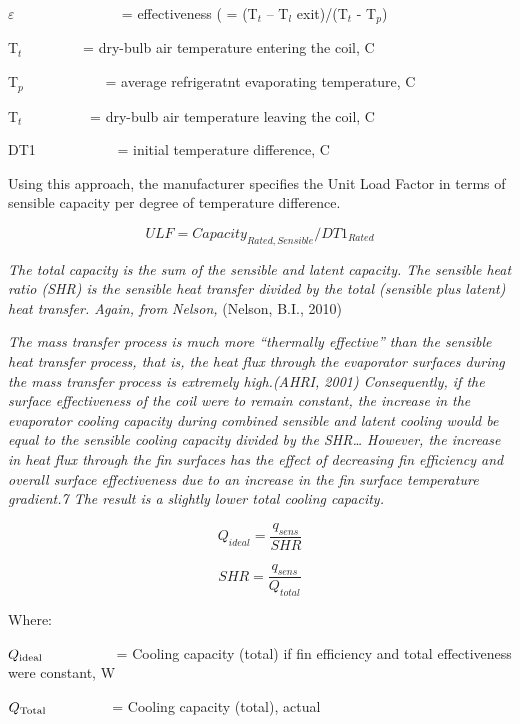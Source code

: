 \(\varepsilon\) ~~~~~~~~~~~~~~ = effectiveness ( = (T\(_{t}\) -- T\(_{l}\) exit)/(T\(_{t}\) - T\(_{p}\))

T\(_{t}\)~~~~~~~~ = dry-bulb air temperature entering the coil, C

T\(_{p}\)~~~~~~~~~~~ = average refrigeratnt evaporating temperature, C

T\(_{t}\)~~~~~~~~~ = dry-bulb air temperature leaving the coil, C

DT1~~~~~~~~~~~ = initial temperature difference, C

Using this approach, the manufacturer specifies the Unit Load Factor in terms of sensible capacity per degree of temperature difference.

\begin{equation}
ULF = Capacit{y_{Rated,Sensible}}/DT{1_{Rated}}
\end{equation}

\emph{The total capacity is the sum of the sensible and latent capacity. The sensible heat ratio (SHR) is the sensible heat transfer divided by the total (sensible plus latent) heat transfer. Again, from Nelson,} (Nelson, B.I., 2010)

\emph{The mass transfer process is much more ``thermally effective'' than the sensible heat transfer process, that is, the heat flux through the evaporator surfaces during the mass transfer process is extremely high.(AHRI, 2001) Consequently, if the surface effectiveness of the coil were to remain constant, the increase in the evaporator cooling capacity during combined sensible and latent cooling would be equal to the sensible cooling capacity divided by the SHR\ldots{} However, the increase in heat flux through the fin surfaces has the effect of decreasing fin efficiency and overall surface effectiveness due to an increase in the fin surface temperature gradient.7 The result is a slightly lower total cooling capacity.}

\begin{equation}
  Q_{ideal} = \frac{q_{sens}}{SHR}
\end{equation}

\begin{equation}
  SHR = \frac{q_{sens}}{Q_{total}}
\end{equation}

Where:

\({Q_{{\rm{ideal}}}}\) ~~~~~~~~~ = Cooling capacity (total) if fin efficiency and total effectiveness were constant, W

\({Q_{{\rm{Total}}}}\) ~~~~~~~~ = Cooling capacity (total), actual

